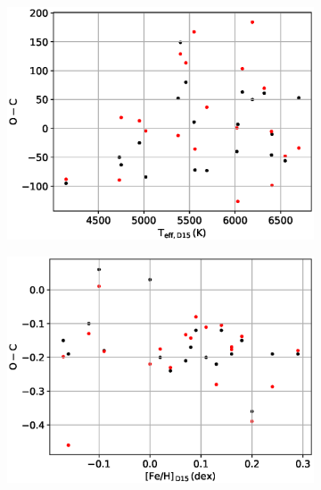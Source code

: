  \begin{figure}
\centering
 \begin{subfigure}[b]{0.5\linewidth}
    \centering
    \includegraphics[width=\linewidth]{5-images/doyleT} 
    \caption{} 
    \label{doyle:a} 
    \vspace{4ex}
  \end{subfigure}%
  \begin{subfigure}[b]{0.5\linewidth}
    \centering
    \includegraphics[width=\linewidth]{5-images/doyleM} 
    \caption{} 
    \label{doyle:b} 
    \vspace{4ex}
  \end{subfigure} 
  \begin{subfigure}[b]{0.5\linewidth}

\end{subfigure}
\end{figure}
